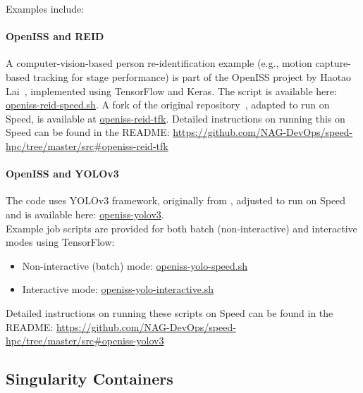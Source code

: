 \noindent Examples include:
\paragraph{OpenISS and REID}
\label{sect:openiss-reid}

A computer-vision-based person re-identification example 
(e.g., motion capture-based tracking for stage performance) is part of the OpenISS
project by Haotao Lai~\cite{lai-haotao-mcthesis19}, implemented using TensorFlow and Keras.
The script is available here:
\href{https://github.com/NAG-DevOps/speed-hpc/blob/master/src/openiss-reid-speed.sh}{openiss-reid-speed.sh}.
A fork of the original repository~\cite{openiss-reid-tfk}, adapted to run on Speed, is available at
\href{https://github.com/NAG-DevOps/openiss-reid-tfk}{openiss-reid-tfk}.
Detailed instructions on running this on Speed can be found in the README:
\url{https://github.com/NAG-DevOps/speed-hpc/tree/master/src#openiss-reid-tfk}

\paragraph{OpenISS and YOLOv3}
\label{sect:openiss-yolov3}

The code uses YOLOv3 framework, originally from \cite{openiss-yolov3}, adjusted to 
run on Speed and is available here: \href{https://github.com/NAG-DevOps/openiss-yolov3}{openiss-yolov3}.\\

\noindent Example job scripts are provided for both batch (non-interactive) and interactive modes using TensorFlow:

\begin{itemize}
  \item Non-interactive (batch) mode:
  \href{https://github.com/NAG-DevOps/speed-hpc/blob/master/src/openiss-yolo-speed.sh}
  {openiss-yolo-speed.sh}
	\item Interactive mode:
  \href{https://github.com/NAG-DevOps/speed-hpc/blob/master/src/openiss-yolo-interactive.sh}
  {openiss-yolo-interactive.sh}
\end{itemize}

\noindent Detailed instructions on running these scripts on Speed can be found in the README:
\url{https://github.com/NAG-DevOps/speed-hpc/tree/master/src#openiss-yolov3}

\subsection{Singularity Containers}
\label{sect:singularity-containers}

